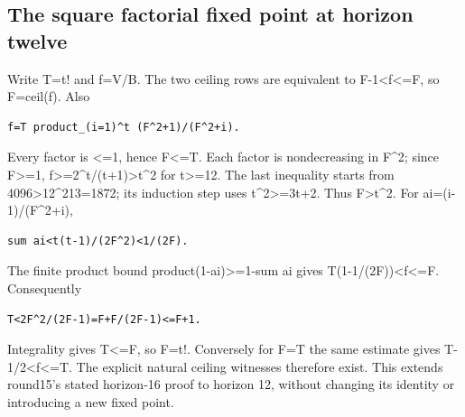 \subsection{The square factorial fixed point at horizon twelve}



Write T=\allowbreak{}t! and f=\allowbreak{}V/\allowbreak{}B. The two ceiling rows are equivalent to F-1\textless{}\allowbreak{}f\textless{}\allowbreak{}=\allowbreak{}F, so F=\allowbreak{}ceil(f). Also



\begin{verbatim}
f=T product_(i=1)^t (F^2+1)/(F^2+i).
\end{verbatim}

Every factor is \textless{}\allowbreak{}=\allowbreak{}1, hence F\textless{}\allowbreak{}=\allowbreak{}T. Each factor is nondecreasing in F\textasciicircum{}\allowbreak{}2; since F\textgreater{}\allowbreak{}=\allowbreak{}1, f\textgreater{}\allowbreak{}=\allowbreak{}2\textasciicircum{}\allowbreak{}t/\allowbreak{}(t+\allowbreak{}1)\textgreater{}\allowbreak{}t\textasciicircum{}\allowbreak{}2 for t\textgreater{}\allowbreak{}=\allowbreak{}12. The last inequality starts from 4096\textgreater{}\allowbreak{}12\textasciicircum{}\allowbreak{}2\textasteriskcentered{}\allowbreak{}13=\allowbreak{}1872; its induction step uses t\textasciicircum{}\allowbreak{}2\textgreater{}\allowbreak{}=\allowbreak{}3t+\allowbreak{}2. Thus F\textgreater{}\allowbreak{}t\textasciicircum{}\allowbreak{}2. For ai=\allowbreak{}(i-1)/\allowbreak{}(F\textasciicircum{}\allowbreak{}2+\allowbreak{}i),



\begin{verbatim}
sum ai<t(t-1)/(2F^2)<1/(2F).
\end{verbatim}

The finite product bound product(1-ai)\textgreater{}\allowbreak{}=\allowbreak{}1-sum ai gives T(1-1/\allowbreak{}(2F))\textless{}\allowbreak{}f\textless{}\allowbreak{}=\allowbreak{}F. Consequently



\begin{verbatim}
T<2F^2/(2F-1)=F+F/(2F-1)<=F+1.
\end{verbatim}

Integrality gives T\textless{}\allowbreak{}=\allowbreak{}F, so F=\allowbreak{}t!. Conversely for F=\allowbreak{}T the same estimate gives T-1/\allowbreak{}2\textless{}\allowbreak{}f\textless{}\allowbreak{}=\allowbreak{}T. The explicit natural ceiling witnesses therefore exist. This extends round15's stated horizon-16 proof to horizon 12, without changing its identity or introducing a new fixed point.



